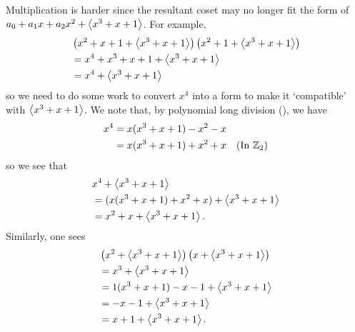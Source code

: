 \begin{example}
    Multiplication is harder since the resultant coset may no longer fit the form of $a_0 + a_1x + a_2x^2 + \left\langle x^3+x+1\right\rangle$. For example,
    \begin{align*}
        &\left(x^2 + x + 1 + \left\langle x^3 + x + 1\right\rangle\right)\left(x^2 + 1 + \left\langle x^3 + x + 1\right\rangle\right)\\
        &= x^4+x^3+x+1 + \left\langle x^3 + x + 1\right\rangle\\
        &= x^4 + \left\langle x^3 + x + 1\right\rangle
    \end{align*}
    so we need to do some work to convert $x^4$ into a form to make it `compatible' with $\left\langle x^3 + x + 1\right\rangle$. We note that, by polynomial long division (), we have
    \begin{align*}
        x^4 &= x(x^3+x+1) - x^2 - x\\
        &= x(x^3+x+1) + x^2 + x & (\text{In } \mathbb{Z}_2)
    \end{align*}
    so we see that
    \begin{align*}
        &x^4 + \left\langle x^3 + x + 1\right\rangle\\
        &= (x(x^3+x+1) + x^2 + x) + \left\langle x^3 + x + 1\right\rangle\\
        &= x^2 + x + \left\langle x^3 + x + 1\right\rangle.
    \end{align*}
    Similarly, one sees
    \begin{align*}
        &\left(x^2 + \left\langle x^3 + x + 1\right\rangle\right)\left(x + \left\langle x^3 + x + 1\right\rangle\right)\\
        &= x^3 + \left\langle x^3 + x + 1\right\rangle\\
        &= 1(x^3+x+1) - x - 1 + \left\langle x^3 + x + 1\right\rangle\\
        &= -x - 1 + \left\langle x^3 + x + 1\right\rangle\\
        &= x + 1 + \left\langle x^3 + x + 1\right\rangle.
    \end{align*}
\end{example}

